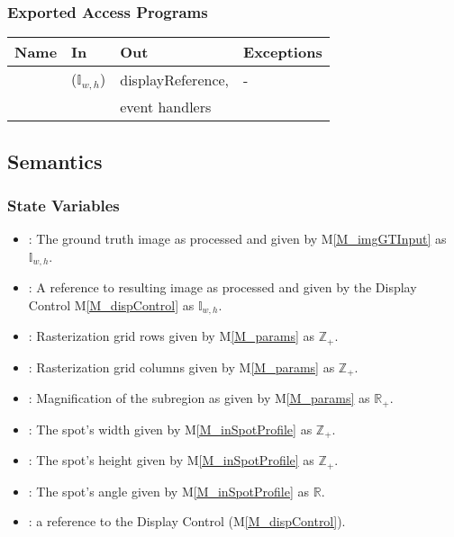 \documentclass[12pt, titlepage]{article}
\newcommand{\mref}[1]{M\ref{#1}}
\newcommand{\mrefp}[1]{(\mref{#1})}
\begin{document}
\subsubsection{Exported Access Programs}

\begin{center}
\begin{tabular}{L{2cm} L{4cm} L{5cm} L{2cm}}
\hline
\textbf{Name} & \textbf{In} & \textbf{Out} & \textbf{Exceptions} \\
\hline
{} &  ($\mathbb{I}_{w,h}$) & displayReference, & - \\
           &                  & event handlers \\
\hline
\end{tabular}
\end{center}

\subsection{Semantics}

\subsubsection{State Variables}
\begin{itemize}
  \item {}: The ground truth image as processed and given by \mref{M_imgGTInput} as $\mathbb{I}_{w,h}$.
  \item {}: A reference to resulting image as processed and given by the Display Control \mref{M_dispControl} as $\mathbb{I}_{w,h}$.
  \item {}: Rasterization grid rows given by \mref{M_params} as $\mathbb{Z}_+$.
  \item {}: Rasterization grid columns given by \mref{M_params} as $\mathbb{Z}_+$.
  \item {}: Magnification of the subregion as given by \mref{M_params} as $\mathbb{R}_+$.
  \item {}: The spot's width given by \mref{M_inSpotProfile} as $\mathbb{Z}_+$.
  \item {}: The spot's height given by \mref{M_inSpotProfile} as $\mathbb{Z}_+$.
  \item {}: The spot's angle given by \mref{M_inSpotProfile} as $\mathbb{R}$.
  \item {}: a reference to the Display Control \mrefp{M_dispControl}.
\end{itemize}
\end{document}
